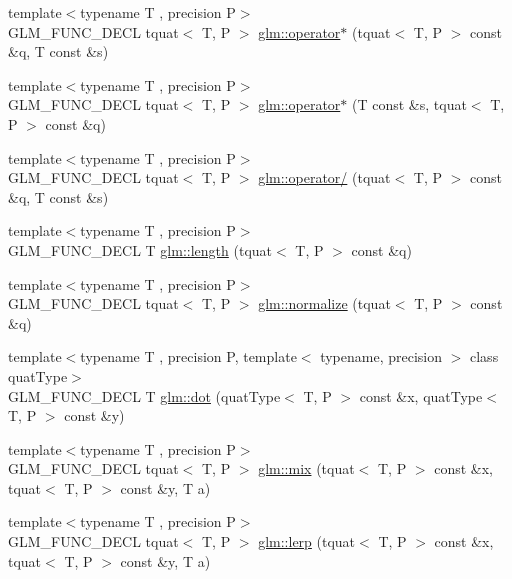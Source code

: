 \begin{DoxyCompactItemize}
\item 
{\footnotesize template$<$typename T , precision P$>$ }\\G\+L\+M\+\_\+\+F\+U\+N\+C\+\_\+\+D\+E\+C\+L tquat$<$ T, P $>$ \hyperlink{group__gtc__quaternion_ga64f3ff448c382fd6642eafddd6ff65ea}{glm\+::operator$\ast$} (tquat$<$ T, P $>$ const \&q, T const \&s)
\item 
{\footnotesize template$<$typename T , precision P$>$ }\\G\+L\+M\+\_\+\+F\+U\+N\+C\+\_\+\+D\+E\+C\+L tquat$<$ T, P $>$ \hyperlink{group__gtc__quaternion_ga8b18b7e92f80b6b26550a1035bca33ba}{glm\+::operator$\ast$} (T const \&s, tquat$<$ T, P $>$ const \&q)
\item 
{\footnotesize template$<$typename T , precision P$>$ }\\G\+L\+M\+\_\+\+F\+U\+N\+C\+\_\+\+D\+E\+C\+L tquat$<$ T, P $>$ \hyperlink{group__gtc__quaternion_gab52fd3ac627908aa2aa1df96ddcdd113}{glm\+::operator/} (tquat$<$ T, P $>$ const \&q, T const \&s)
\item 
{\footnotesize template$<$typename T , precision P$>$ }\\G\+L\+M\+\_\+\+F\+U\+N\+C\+\_\+\+D\+E\+C\+L T \hyperlink{group__gtc__quaternion_gac682181783027544c8d251b4d3a60cf8}{glm\+::length} (tquat$<$ T, P $>$ const \&q)
\item 
{\footnotesize template$<$typename T , precision P$>$ }\\G\+L\+M\+\_\+\+F\+U\+N\+C\+\_\+\+D\+E\+C\+L tquat$<$ T, P $>$ \hyperlink{group__gtc__quaternion_ga35b6bcb22ac6d1e4a85440f5b69bdf86}{glm\+::normalize} (tquat$<$ T, P $>$ const \&q)
\item 
{\footnotesize template$<$typename T , precision P, template$<$ typename, precision $>$ class quat\+Type$>$ }\\G\+L\+M\+\_\+\+F\+U\+N\+C\+\_\+\+D\+E\+C\+L T \hyperlink{group__gtc__quaternion_gac54dfc83de465a2d03e90d342242ab3d}{glm\+::dot} (quat\+Type$<$ T, P $>$ const \&x, quat\+Type$<$ T, P $>$ const \&y)
\item 
{\footnotesize template$<$typename T , precision P$>$ }\\G\+L\+M\+\_\+\+F\+U\+N\+C\+\_\+\+D\+E\+C\+L tquat$<$ T, P $>$ \hyperlink{group__gtc__quaternion_ga31cc82178742c36450f5662bd4fb30b0}{glm\+::mix} (tquat$<$ T, P $>$ const \&x, tquat$<$ T, P $>$ const \&y, T a)
\item 
{\footnotesize template$<$typename T , precision P$>$ }\\G\+L\+M\+\_\+\+F\+U\+N\+C\+\_\+\+D\+E\+C\+L tquat$<$ T, P $>$ \hyperlink{group__gtc__quaternion_ga5692804fa4db9e762a1c19b607e54435}{glm\+::lerp} (tquat$<$ T, P $>$ const \&x, tquat$<$ T, P $>$ const \&y, T a)

\end{DoxyCompactItemize}
